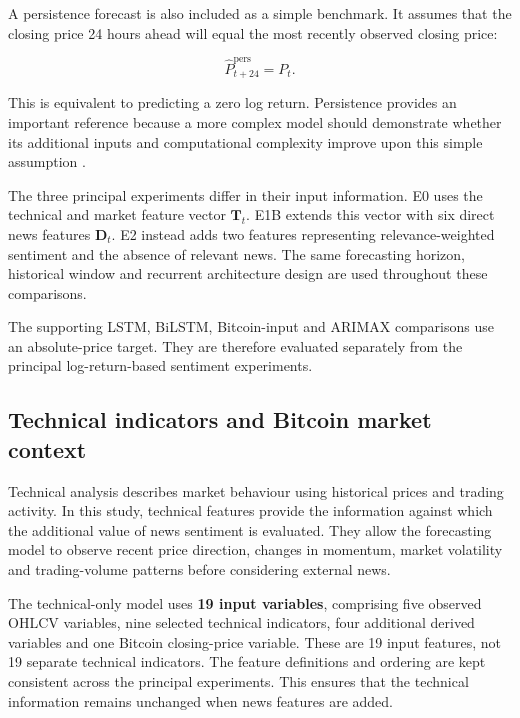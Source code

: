 A persistence forecast is also included as a simple benchmark. It assumes that the closing price 24 hours ahead will equal the most recently observed closing price:

\begin{equation}
\widehat{P}_{t+24}^{\mathrm{pers}}=P_t.
\label{eq:persistence}
\end{equation}

This is equivalent to predicting a zero log return. Persistence provides an important reference because a more complex model should demonstrate whether its additional inputs and computational complexity improve upon this simple assumption \citep{Hyndman2021}.

The three principal experiments differ in their input information. E0 uses the technical and market feature vector $\mathbf{T}_t$. E1B extends this vector with six direct news features $\mathbf{D}_t$. E2 instead adds two features representing relevance-weighted sentiment and the absence of relevant news. The same forecasting horizon, historical window and recurrent architecture design are used throughout these comparisons.

The supporting LSTM, BiLSTM, Bitcoin-input and ARIMAX comparisons use an absolute-price target. They are therefore evaluated separately from the principal log-return-based sentiment experiments.

\subsection{Technical indicators and Bitcoin market context}
\label{sec:method_technical}

Technical analysis describes market behaviour using historical prices and trading activity. In this study, technical features provide the information against which the additional value of news sentiment is evaluated. They allow the forecasting model to observe recent price direction, changes in momentum, market volatility and trading-volume patterns before considering external news.

The technical-only model uses \textbf{19 input variables}, comprising five observed OHLCV variables, nine selected technical indicators, four additional derived variables and one Bitcoin closing-price variable. These are 19 input features, not 19 separate technical indicators. The feature definitions and ordering are kept consistent across the principal experiments. This ensures that the technical information remains unchanged when news features are added.

